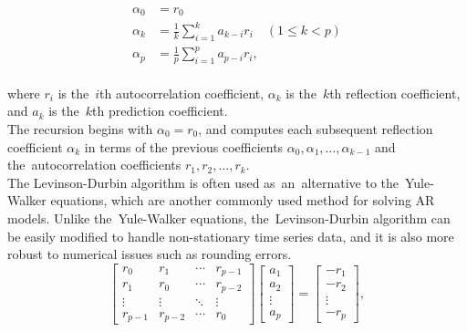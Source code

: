 \begin{equation*}
    \begin{aligned}
        \alpha_0 &= r_0 \\
        \alpha_k &= \frac{1}{k} \sum_{i=1}^{k} a_{k-i} r_i \quad (1 \leq k < p) \\
        \alpha_p &= \frac{1}{p} \sum_{i=1}^{p} a_{p-i} r_i,
    \end{aligned}
\end{equation*}
\\
where $r_i$ is the~$i$th autocorrelation coefficient, $\alpha_k$ is the~$k$th reflection coefficient, and $a_k$ is the~$k$th
prediction coefficient.
\\
The recursion begins with $\alpha_0 = r_0$, and computes each subsequent reflection coefficient $\alpha_k$ in terms of the
previous coefficients $\alpha_0, \alpha_1, \ldots, \alpha_{k-1}$ and the~autocorrelation coefficients $r_1, r_2, \ldots, r_k$.\\
The Levinson-Durbin algorithm is often used as~an~alternative to the~Yule-Walker equations, which are another commonly
used method for solving AR models. Unlike the~Yule-Walker equations, the~Levinson-Durbin algorithm can be easily
modified to handle non-stationary time series data, and it is also more robust to numerical issues such as
rounding errors.\\
\begin{equation*}
    \begin{bmatrix}
        r_0     & r_1     & \cdots & r_{p-1} \\
        r_1     & r_0     & \cdots & r_{p-2} \\
        \vdots  & \vdots  & \ddots & \vdots  \\
        r_{p-1} & r_{p-2} & \cdots & r_0
    \end{bmatrix}
    \begin{bmatrix}
        a_1    \\
        a_2    \\
        \vdots \\
        a_p
    \end{bmatrix}
    =
    \begin{bmatrix}
        -r_1   \\
        -r_2   \\
        \vdots \\
        -r_p
    \end{bmatrix},
\end{equation*}


